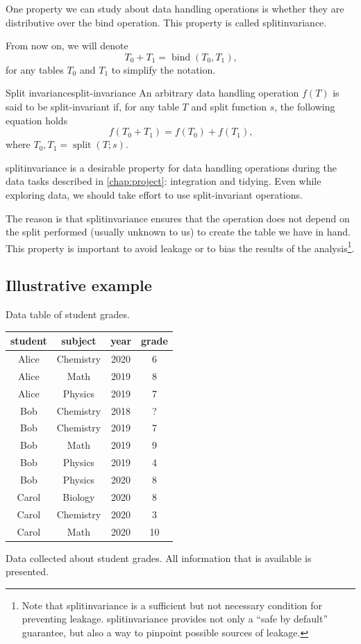 One property we can study about data handling operations is whether they are distributive
over the bind operation.  This property is called \gls{splitinvariance}.

From now on, we will denote \[
  T_0 + T_1 = \operatorname{bind}(T_0, T_1)\text{,}
\] for any tables $T_0$ and $T_1$ to simplify the notation.

\begin{defbox}{Split invariance}{split-invariance}
An arbitrary data handling operation $f(T)$ is said to be split-invariant
if, for any table $T$ and split function $s$, the following equation holds \[
  f\!\left(T_0 + T_1\right) =
    f\!\left(T_0\right) + f\!\left(T_1\right)\text{,}
\] where $T_0, T_1 = \operatorname{split}\!\left(T; s\right)$.
\end{defbox}

\Gls{splitinvariance} is a desirable property for data handling operations during the data
tasks described in \cref{chap:project}: integration and tidying.  Even while exploring
data, we should take effort to use split-invariant operations.

The reason is that \gls{splitinvariance} ensures that the operation does not depend on the
split performed (usually unknown to us) to create the table we have in hand.  This
property is important to avoid \gls{leakage} or to bias the results of the
analysis\footnote{Note that \gls{splitinvariance} is a sufficient but not necessary condition
for preventing \gls{leakage}.  \Gls{splitinvariance} provides not only a ``safe by default''
guarantee, but also a way to pinpoint possible sources of \gls{leakage}.}.

\subsection{Illustrative example}

\begin{tablebox}[label=tab:grades1]{Data table of student grades.}
  \centering
  \begin{tabular}{cccc}
    \toprule
    \textbf{student} & \textbf{subject} & \textbf{year} & \textbf{grade} \\
    \midrule
    Alice & Chemistry & 2020 & 6 \\
    Alice & Math & 2019 & 8 \\
    Alice & Physics & 2019 & 7 \\
    Bob & Chemistry & 2018 & ? \\
    Bob & Chemistry & 2019 & 7 \\
    Bob & Math & 2019 & 9 \\
    Bob & Physics & 2019 & 4 \\
    Bob & Physics & 2020 & 8 \\
    Carol & Biology & 2020 & 8 \\
    Carol & Chemistry & 2020 & 3 \\
    Carol & Math & 2020 & 10 \\
    \bottomrule
  \end{tabular}
  \tcblower
  Data collected about student grades.  All information that is available is presented.
\end{tablebox}

